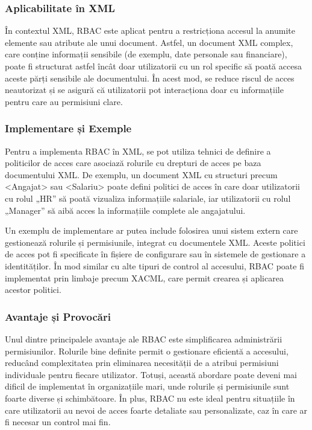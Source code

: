 \documentclass[runningheads]{llncs}
\begin{document}
\subsubsection{Aplicabilitate în XML}

În contextul XML, RBAC este aplicat pentru a res\-tricționa accesul la anumite elemente sau atribute ale unui document. Astfel, un document XML complex, care conține informații sensibile (de exemplu, date personale sau financiare), poate fi structurat astfel încât doar utilizatorii cu un rol specific să poată accesa aceste părți sensibile ale documentului. În acest mod, se reduce riscul de acces neautorizat și se asigură că utilizatorii pot interacționa doar cu informațiile pentru care au permisiuni clare.

\subsubsection{Implementare și Exemple}

Pentru a implementa RBAC în XML, se pot utiliza tehnici de definire a politicilor de acces care asociază rolurile cu drepturi de acces pe baza documentului XML. De exemplu, un document XML cu structuri precum <Angajat> sau <Salariu> poate defini politici de acces în care doar utilizatorii cu rolul „HR” să poată vizualiza informațiile salariale, iar utilizatorii cu rolul „Manager” să aibă acces la informațiile complete ale angajatului.

Un exemplu de implementare ar putea include folosirea unui sistem extern care gestionează rolurile și permisiunile, integrat cu documentele XML. Aceste politici de acces pot fi specificate în fișiere de configurare sau în sistemele de gestionare a identităților. În mod similar cu alte tipuri de control al accesului, RBAC poate fi implementat prin limbaje precum XACML, care permit crearea și aplicarea acestor politici.

\subsubsection{Avantaje și Provocări}

Unul dintre principalele avantaje ale RBAC este simplificarea administrării permisiunilor. Rolurile bine definite permit o gestionare eficientă a accesului, reducând complexitatea prin eliminarea necesității de a atribui permisiuni individuale pentru fiecare utilizator. Totuși, această abordare poate deveni mai dificil de implementat în organizațiile mari, unde rolurile și permisiunile sunt foarte diverse și schimbătoare. În plus, RBAC nu este ideal pentru situațiile în care utilizatorii au nevoi de acces foarte detaliate sau personalizate, caz în care ar fi necesar un control mai fin.
\end{document}
